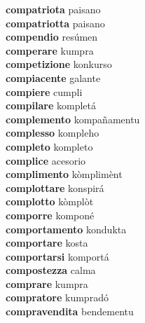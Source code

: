 \textbf{compatriota } paisano \\
\textbf{compatriotta } paisano \\
\textbf{compendio } resúmen \\
\textbf{comperare } kumpra \\
\textbf{competizione } konkurso \\
\textbf{compiacente } galante \\
\textbf{compiere } cumpli \\
\textbf{compilare } kompletá \\
\textbf{complemento } kompañamentu \\
\textbf{complesso } kompleho \\
\textbf{completo } kompleto \\
\textbf{complice } acesorio \\
\textbf{complimento } kòmplimènt \\
\textbf{complottare } konspirá \\
\textbf{complotto } kòmplòt \\
\textbf{comporre } komponé \\
\textbf{comportamento } kondukta \\
\textbf{comportare } kosta \\
\textbf{comportarsi } komportá \\
\textbf{compostezza } calma \\
\textbf{comprare } kumpra \\
\textbf{compratore } kumpradó \\
\textbf{compravendita } bendementu \\
